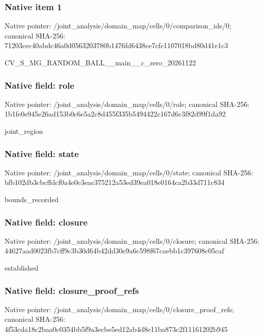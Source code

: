 \documentclass[10pt,a4paper]{article}
\begin{document}
\subsubsection{Native item 1}


Native pointer: /joint\_analysis/domain\_m\allowbreak{}ap/cells/0/comparison\_id\allowbreak{}s/0; canonical SHA-256: 71203cec40abdc46a0d05632\allowbreak{}03780b1476fd6438ce7cfc11\allowbreak{}07018bd80d41e1c3


CV\_S\_MG\_RANDOM\_BALL\_\_mai\allowbreak{}n\_\_c\_zero\_20261122


\subsubsection{Native field: role}


Native pointer: /joint\_analysis/domain\_map/cells/0/role; canonical SHA-256: 1b1fe0e945e26ad153b0c6e5\allowbreak{}a2c8d455f335b5494422c167\allowbreak{}d6c3f82d99f1da92


joint\_region


\subsubsection{Native field: state}


Native pointer: /joint\_analysis/domain\_m\allowbreak{}ap/cells/0/state; canonical SHA-256: bfb102db3cbcffdcf0a4e0c3\allowbreak{}eac375212a53ed39ea018e01\allowbreak{}64ca2b33d711c834


bounds\_recorded


\subsubsection{Native field: closure}


Native pointer: /joint\_analysis/domain\_m\allowbreak{}ap/cells/0/closure; canonical SHA-256: 44627aad0023fb7cff9c3b30\allowbreak{}d64b42dd30e9a6c598f67cae\allowbreak{}bb1c397608c05caf


established


\subsubsection{Native field: closure\_proof\_refs}


Native pointer: /joint\_analysis/domain\_m\allowbreak{}ap/cells/0/closure\_proof\allowbreak{}\_refs; canonical SHA-256: 4f53cda18c2baa0c0354bb5f\allowbreak{}9a3ecbe5ed12ab4d8e11ba87\allowbreak{}3c2f11161202b945
\end{document}
